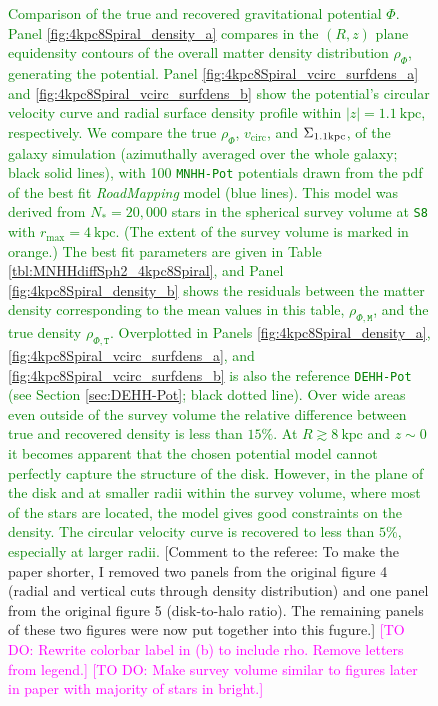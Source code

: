 \documentclass[iop,revtex4,numberedappendix,appendixfloats]{emulateapj}
\newcommand{\RM}{{\sl RoadMapping}}
\newcommand{\Wilma}[1]{\textcolor{Magenta}{#1}}
\newcommand{\NEW}[1]{\textcolor{Green}{#1}}
\newcommand{\COMMENT}[1]{\textcolor{ProcessBlue}{#1}}
\begin{document}
\begin{figure}[!htbp]
\begin{minipage}{\textwidth}
    \end{minipage}
    \caption{\NEW{Comparison of the true and recovered gravitational potential $\Phi$. Panel \ref{fig:4kpc8Spiral_density_a} compares in the $(R,z)$ plane equidensity contours of the overall matter density distribution $\rho_{\Phi}$, generating the potential. Panel \ref{fig:4kpc8Spiral_vcirc_surfdens_a} and \ref{fig:4kpc8Spiral_vcirc_surfdens_b} show the potential's circular velocity curve and radial surface density profile within $|z|=1.1~\text{kpc}$, respectively. We compare the true $\rho_{\Phi}$, $v_\text{circ}$, and $\Sigma_{\rm 1.1kpc}$, of the galaxy simulation (azimuthally averaged over the whole galaxy; black solid lines), with 100 \texttt{MNHH-Pot} potentials drawn from the pdf of the best fit \RM{} model (blue lines). This model was derived from $N_*=20,000$ stars in the spherical survey volume at \texttt{S8} with $r_\text{max}=4~\text{kpc}$. (The extent of the survey volume is marked in orange.) The best fit parameters are given in Table \ref{tbl:MNHHdiffSph2_4kpc8Spiral}, and Panel \ref{fig:4kpc8Spiral_density_b} shows the residuals between the matter density corresponding to the mean values in this table, $\rho_{\Phi,\texttt{M}}$, and the true density  $\rho_{\Phi,\texttt{T}}$. Overplotted in Panels \ref{fig:4kpc8Spiral_density_a}, \ref{fig:4kpc8Spiral_vcirc_surfdens_a}, and \ref{fig:4kpc8Spiral_vcirc_surfdens_b} is also the reference \texttt{DEHH-Pot} (see Section \ref{sec:DEHH-Pot}; black dotted line). Over wide areas even outside of the survey volume the relative difference between true and recovered density is less than $15\%$. At $R\gtrsim8~\text{kpc}$ and $z\sim0$ it becomes apparent that the chosen potential model cannot perfectly capture the structure of the disk. However, in the plane of the disk and at smaller radii within the survey volume, where most of the stars are located, the model gives good constraints on the density. The circular velocity curve is recovered to less than $5\%$, especially at larger radii.} \COMMENT{[Comment to the referee: To make the paper shorter, I removed two panels from the original figure 4 (radial and vertical cuts through density distribution) and one panel from the original figure 5 (disk-to-halo ratio). The remaining panels of these two figures were now put together into this fugure.]} \Wilma{[TO DO: Rewrite colorbar label in (b) to include rho. Remove letters from legend.]} \Wilma{[TO DO: Make survey volume similar to figures later in paper with majority of stars in bright.]}}
\label{fig:4kpc8Spiral_dens_vcirc_surfdens}
\end{figure}
\end{document}
